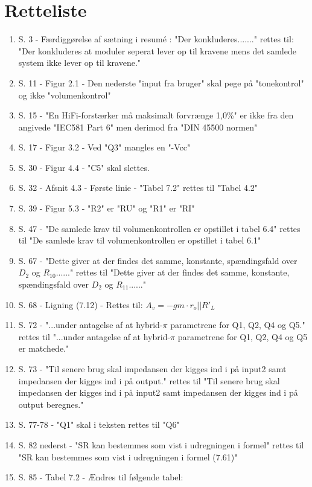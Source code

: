 


\section*{Retteliste}

\begin{enumerate}
\item S. 3 - Færdiggørelse af sætning i resumé : "Der konkluderes......." rettes til: "Der konkluderes at moduler seperat lever op til kravene mens det samlede system ikke lever op til kravene."
\item S. 11 - Figur 2.1 - Den nederste "input fra bruger" skal pege på "tonekontrol" og ikke "volumenkontrol"
\item S. 15 - "En HiFi-forstærker må maksimalt forvrænge 1,0\%" er ikke fra den angivede "IEC581 Part 6" men derimod fra "DIN 45500 normen"
\item S. 17 - Figur 3.2 - Ved "Q3" mangles en "-Vcc"
\item S. 30 - Figur 4.4 - "C5" skal slettes.
\item S. 32 - Afsnit 4.3 - Første linie - "Tabel 7.2" rettes til "Tabel 4.2"
\item S. 39 - Figur 5.3 - "R2" er "RU" og "R1" er "RI"
\item S. 47 - "De samlede krav til volumenkontrollen er opstillet i tabel 6.4" rettes til  "De samlede krav til volumenkontrollen er opstillet i tabel 6.1" 
\item S. 67 - "Dette giver at der findes det samme, konstante, spændingsfald over $D_2$ og $R_10$......" rettes til "Dette giver at der findes det samme, konstante, spændingsfald over $D_2$ og $R_11$......"
\item S. 68 - Ligning (7.12) - Rettes til: $A_v = -gm \cdot r_o||R'_L$
\item S. 72 - "...under antagelse af at hybrid-$\pi$ parametrene for Q1, Q2, Q4 og Q5." rettes til "...under antagelse af at hybrid-$\pi$ parametrene for Q1, Q2, Q4 og Q5 er matchede."
\item S. 73 - "Til senere brug skal impedansen der kigges ind i på input2 samt impedansen der kigges ind i på output." rettes til "Til senere brug skal impedansen der kigges ind i på input2 samt impedansen der kigges ind i på output beregnes."
\item S. 77-78 - "Q1" skal i teksten rettes til "Q6"
\item S. 82 nederst - "SR kan bestemmes som vist i udregningen i formel" rettes til "SR kan bestemmes som vist i udregningen i formel (7.61)"
\item S. 85 - Tabel 7.2 - Ændres til følgende tabel:
\end{enumerate} 
